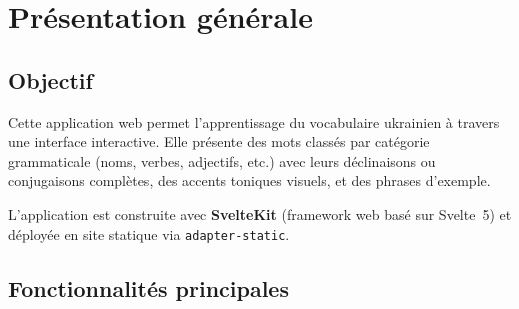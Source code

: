 \section{Présentation générale}

\subsection{Objectif}

Cette application web permet l'apprentissage du vocabulaire ukrainien à travers une interface interactive. Elle présente des mots classés par catégorie grammaticale (noms, verbes, adjectifs, etc.) avec leurs déclinaisons ou conjugaisons complètes, des accents toniques visuels, et des phrases d'exemple.

L'application est construite avec \textbf{SvelteKit} (framework web basé sur Svelte~5) et déployée en site statique via \texttt{adapter-static}.

\subsection{Fonctionnalités principales}

